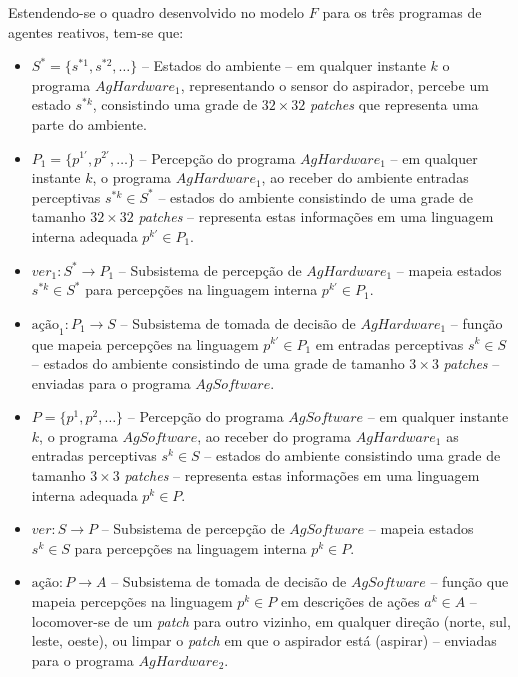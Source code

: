 Estendendo-se o quadro desenvolvido no modelo $F$ para os três programas de agentes reativos, tem-se que:
\begin{itemize}
    \item $S^* = \{s^{*1}, s^{*2}, \ldots\}$ -- Estados do ambiente – em qualquer instante $k$ o programa $AgHardware_1$, representando o sensor do aspirador, percebe um estado $s^{*k}$, consistindo uma grade de $32 \times 32$ \textit{patches} que representa uma parte do ambiente.
    
    \item $P_1 = \{p^{1\prime}, p^{2\prime}, \ldots \}$ -- Percepção do programa $AgHardware_1$ – 
    em qualquer instante $k$, o programa $AgHardware_1$, ao receber do ambiente entradas perceptivas $s^{*k} \in S^*$ – estados do 
    ambiente consistindo de uma grade de tamanho $32 \times 32$ 
    \textit{patches} – representa estas informações em uma linguagem interna adequada $p^{k\prime} \in P_1$.
    
    \item $ver_1: S^*  \rightarrow P_1$ --	Subsistema de percepção de $AgHardware_1$ – mapeia estados $s^{*k} \in S^*$ para percepções na linguagem interna $p^{k\prime} \in P_1$.
    
    \item $\textrm{ação}_1: P_1 \rightarrow S$ -- Subsistema de tomada de decisão de $AgHardware_1$ – função que mapeia percepções na linguagem $p^{k\prime} \in P_1$ em entradas perceptivas $s^k \in S$ – estados do ambiente consistindo de uma grade de tamanho $3 \times 3$ \textit{patches} – enviadas para o programa $AgSoftware$.
    
    \item $P = \{p^1, p^2, \ldots \}$ -- Percepção do programa $AgSoftware$ – em qualquer instante $k$, o programa $AgSoftware$, ao receber do programa $AgHardware_1$ as entradas perceptivas $s^k \in S$ – estados do ambiente consistindo uma grade de tamanho $3 \times 3$ \textit{patches} – representa estas informações em uma linguagem interna adequada $p^k \in P$.
    
    \item $ver: S  \rightarrow P$ -- Subsistema de percepção de $AgSoftware$ – mapeia estados $s^k \in S$ para percepções na linguagem interna $p^k \in P$.
    
    \item $\textrm{ação}: P \rightarrow A$ -- Subsistema de tomada de decisão de $AgSoftware$ – função que mapeia percepções na linguagem $p^k \in P$ em descrições de ações $a^k \in A$ – locomover-se de um \textit{patch} para outro vizinho, em qualquer direção (norte, sul, leste, oeste), ou limpar o \textit{patch} em que o aspirador está (aspirar) – enviadas para o programa $AgHardware_2$.
    

\end{itemize}
